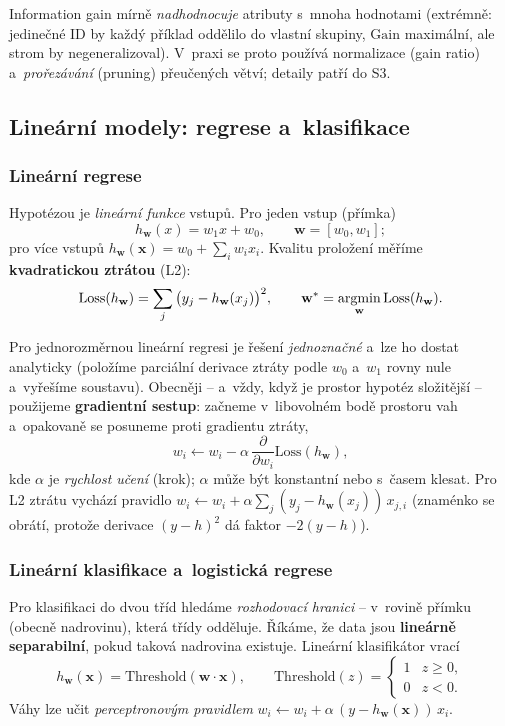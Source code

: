 \begin{poznamka}
Information gain mírně \emph{nadhodnocuje} atributy s~mnoha hodnotami (extrémně: jedinečné ID by každý příklad oddělilo do vlastní skupiny, $\mathrm{Gain}$ maximální, ale strom by negeneralizoval). V~praxi se proto používá normalizace (gain ratio) a~\emph{prořezávání} (pruning) přeučených větví; detaily patří do S3.
\end{poznamka}

\subsection{Lineární modely: regrese a~klasifikace}

\subsubsection*{Lineární regrese}

Hypotézou je \emph{lineární funkce} vstupů. Pro jeden vstup (přímka)
\[ h_{\mathbf{w}}(x) = w_1 x + w_0, \qquad \mathbf{w}=[w_0,w_1]; \]
pro více vstupů $h_{\mathbf{w}}(\mathbf{x}) = w_0 + \sum_i w_i x_i$. Kvalitu proložení měříme \textbf{kvadratickou ztrátou} (L2):
\[ \mathrm{Loss}(h_{\mathbf{w}}) = \sum_j \big(y_j - h_{\mathbf{w}}(x_j)\big)^2, \qquad \mathbf{w}^{*} = \operatorname*{argmin}_{\mathbf{w}} \mathrm{Loss}(h_{\mathbf{w}}). \]

\begin{intuice}
Pro jednorozměrnou lineární regresi je řešení \emph{jednoznačné} a~lze ho dostat analyticky (položíme parciální derivace ztráty podle $w_0$ a~$w_1$ rovny nule a~vyřešíme soustavu). Obecněji -- a~vždy, když je prostor hypotéz složitější -- použijeme \textbf{gradientní sestup}: začneme v~libovolném bodě prostoru vah a~opakovaně se posuneme proti gradientu ztráty,
\[ w_i \leftarrow w_i - \alpha\,\frac{\partial}{\partial w_i}\mathrm{Loss}(h_{\mathbf{w}}), \]
kde $\alpha$ je \emph{rychlost učení} (krok); $\alpha$ může být konstantní nebo s~časem klesat. Pro L2 ztrátu vychází pravidlo $w_i \leftarrow w_i + \alpha\sum_j (y_j-h_{\mathbf{w}}(x_j))\,x_{j,i}$ (znaménko se obrátí, protože derivace $(y-h)^2$ dá faktor $-2(y-h)$).
\end{intuice}

\subsubsection*{Lineární klasifikace a~logistická regrese}

Pro klasifikaci do dvou tříd hledáme \emph{rozhodovací hranici} -- v~rovině přímku (obecně nadrovinu), která třídy odděluje. Říkáme, že data jsou \textbf{lineárně separabilní}, pokud taková nadrovina existuje. Lineární klasifikátor vrací
\[ h_{\mathbf{w}}(\mathbf{x}) = \mathrm{Threshold}(\mathbf{w}\cdot\mathbf{x}), \qquad \mathrm{Threshold}(z)=\begin{cases}1 & z\ge 0,\\ 0 & z<0.\end{cases} \]
Váhy lze učit \emph{perceptronovým pravidlem} $w_i \leftarrow w_i + \alpha\,(y-h_{\mathbf{w}}(\mathbf{x}))\,x_i$.

